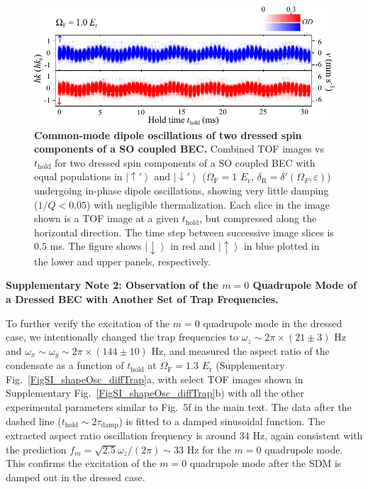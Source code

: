 \documentclass[showpacs,preprintnumbers,amsmath,amssymb, superscriptaddress, aps, reprint]{revtex4-1}
\def\E_r{E_{\text{r}}}
\def\deltaR{\delta_{\text{R}}}
\def\OmegaF{\Omega_{\text{F}}}
\def\thold{t_{\text{hold}}}
\def\taudamp{\tau_{\text{damp}}}
\begin{document}
{{%
\begin{figure}[h]
\centering
\includegraphics[width=6.6in]{SI_Fig2_ComMode_Vfinal.pdf}
\caption{\textbf{Common-mode dipole oscillations of two dressed spin components of a SO coupled BEC.} Combined TOF images vs $\thold$ for two dressed spin components of a SO coupled BEC with equal populations in $\left| { \uparrow '} \right\rangle$ and $\left| { \downarrow '} \right\rangle$ ($\OmegaF = 1$ $\E_r$, ${\deltaR} = \delta '({\Omega _F},\varepsilon )$) undergoing in-phase dipole oscillations, showing very little damping ($1/Q < 0.05$) with negligible thermalization. Each slice in the image shown is a TOF image at a given $\thold$, but compressed along the horizontal direction. The time step between successive image slices is $0.5$ ms. The figure shows $\left|\downarrow\right\rangle$ in red and $\left|\uparrow \right\rangle$ in blue plotted in the lower and upper panels, respectively.}
\label{FigS5}
\end{figure}



\clearpage
\begin{center}
\textbf{Supplementary Note 2: Observation of the \boldmath${m = 0}$ Quadrupole Mode of a Dressed BEC with Another Set of Trap Frequencies.}
\end{center}



To further verify the excitation of the $m = 0$ quadrupole mode in the dressed case, we intentionally changed the trap frequencies to ${\omega _z}\sim 2\pi\times (21 \pm 3)$ Hz and ${\omega _x}\sim{\omega _y}\sim 2\pi\times (144 \pm 10)$ Hz, and measured the aspect ratio of the condensate as a function of $\thold$ at $\OmegaF = 1.3$ $\E_r$ (Supplementary Fig.~\ref{FigSI_shapeOsc_diffTrap}a, with select TOF images shown in Supplementary Fig.~\ref{FigSI_shapeOsc_diffTrap}b) with all the other experimental parameters similar to {Fig.~5f in the main text}. The data after the dashed line (${\thold}\sim 2{\taudamp}$) is fitted to a damped sinusoidal function. The extracted aspect ratio oscillation frequency is around $34$ Hz, again consistent with the prediction ${f_m} = \sqrt {2.5} {\omega _z}/(2\pi )\sim 33$ Hz for the $m = 0$ quadrupole mode. This confirms the excitation of the $m = 0$ quadrupole mode after the SDM is damped out in the dressed case.

}}
\end{document}

